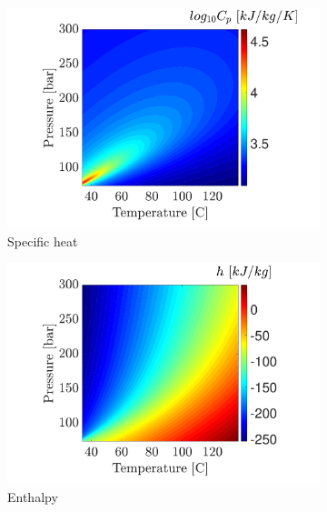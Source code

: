 \documentclass[../Article_Model_Parameters.tex]{subfiles}
\begin{document}
\begin{figure}[H]
\begin{subfigure}[b]{0.32\textwidth}
			\includegraphics[trim = 3.5cm 0cm 1.5cm 0cm,clip,width=\textwidth]{Figures/CP.pdf}	
			\caption{Specific heat}
			\label{fig: SFE_Properties_CP}
		\end{subfigure}
		\hfill
		\begin{subfigure}[b]{0.32\textwidth}
			\centering
			\includegraphics[trim = 3.5cm 0cm 1.5cm 0cm,clip,width=\textwidth]{Figures/Enthalpy.pdf}	
			\caption{Enthalpy}
			\label{fig: SFE_Properties_h}
		\end{subfigure}
		\hfill
		\begin{subfigure}[b]{0.32\textwidth}
			\centering

\end{subfigure}
\end{figure}
\end{document}
